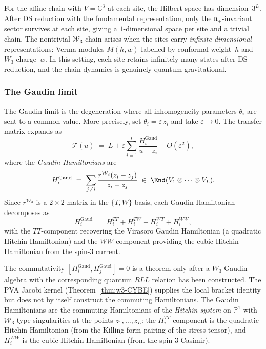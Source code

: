 \begin{remark}%
\label{rem:state-counting}%
%
For the affine chain with $V = \mathbb{C}^3$ at each site,
the Hilbert space has dimension~$3^L$. After DS reduction
with the fundamental representation, only the
$\mathfrak{n}_+$-invariant sector survives at each site,
giving a $1$-dimensional space per site and a trivial chain.
The nontrivial $\mathcal{W}_3$ chain arises when the sites
carry \emph{infinite-dimensional} representations: Verma
modules $M(h, w)$ labelled by conformal weight~$h$ and
$W_3$-charge~$w$. In this setting, each site retains
infinitely many states after DS reduction, and the chain
dynamics is genuinely quantum-gravitational.
\end{remark}

\subsubsection{The Gaudin limit}

\begin{construction}
\label{constr:w3-gaudin}
%
%
The Gaudin limit is the degeneration where all
inhomogeneity parameters $\theta_i$ are sent to a common
value. More precisely, set $\theta_i = \varepsilon\, z_i$
and take $\varepsilon \to 0$. The transfer matrix expands as
\[
\mathcal{T}(u)
\;=\;
L + \varepsilon \sum_{i=1}^{L} \frac{H_i^{\mathrm{Gaud}}}{u - z_i}
+ O(\varepsilon^2),
\]
where the \emph{Gaudin Hamiltonians} are
\begin{equation}
\label{eq:w3-gaudin-hamiltonians}
H_i^{\mathrm{Gaud}}
\;=\;
\sum_{j \ne i}
\frac{r^{\mathcal{W}_3}(z_i - z_j)}{z_i - z_j}
\;\in\;
\End(V_1 \otimes \cdots \otimes V_L).
\end{equation}
Since $r^{\mathcal{W}_3}$ is a $2 \times 2$ matrix in the
$\{T, W\}$ basis, each Gaudin Hamiltonian decomposes as
\begin{equation}
\label{eq:w3-gaudin-decomposition}
H_i^{\mathrm{Gaud}}
\;=\;
H_i^{TT} + H_i^{TW} + H_i^{WT} + H_i^{WW},
\end{equation}
with the $TT$-component recovering the Virasoro Gaudin
Hamiltonian (a quadratic Hitchin Hamiltonian) and the
$WW$-component providing the cubic Hitchin Hamiltonian
from the spin-$3$ current.

The commutativity $[H_i^{\mathrm{Gaud}}, H_j^{\mathrm{Gaud}}] = 0$
is a theorem only after a $W_3$ Gaudin algebra with the corresponding
quantum $RLL$ relation has been constructed. The PVA Jacobi kernel
(Theorem~\ref{thm:w3-CYBE}) supplies the local bracket identity but
does not by itself construct the commuting Hamiltonians. The Gaudin Hamiltonians are
the commuting Hamiltonians of the \emph{Hitchin system}
on $\mathbb{P}^1$ with $\mathcal{W}_3$-type singularities
at the points $z_1, \ldots, z_L$: the $H_i^{TT}$ component
is the quadratic Hitchin Hamiltonian (from the Killing form
pairing of the stress tensor), and $H_i^{WW}$ is the
cubic Hitchin Hamiltonian (from the spin-$3$ Casimir).
\end{construction}

